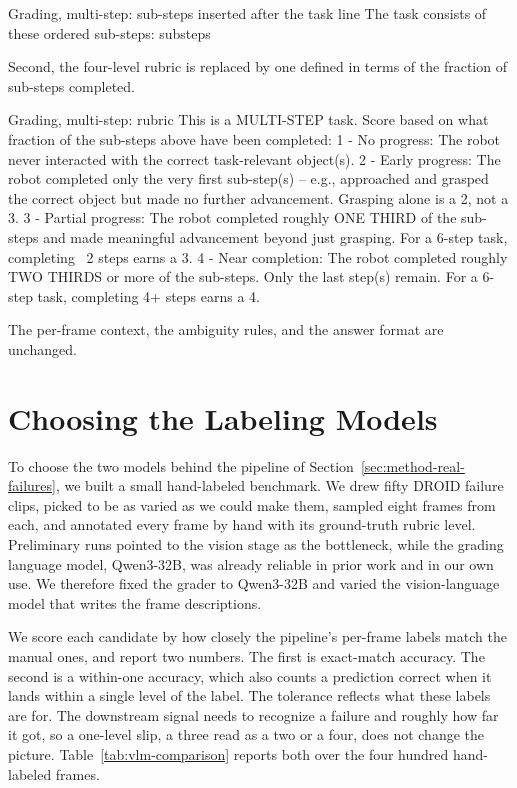 \begin{llmprompt}{Grading, multi-step: sub-steps inserted after the task line}
The task consists of these ordered sub-steps:
{substeps}
\end{llmprompt}

Second, the four-level rubric is replaced by one defined in terms of the fraction of sub-steps completed.

\begin{llmprompt}{Grading, multi-step: rubric}
This is a MULTI-STEP task. Score based on what fraction of the sub-steps above have been completed:
1 - No progress: The robot never interacted with the correct task-relevant object(s).
2 - Early progress: The robot completed only the very first sub-step(s) -- e.g., approached and grasped the correct object but made no further advancement. Grasping alone is a 2, not a 3.
3 - Partial progress: The robot completed roughly ONE THIRD of the sub-steps and made meaningful advancement beyond just grasping. For a 6-step task, completing ~2 steps earns a 3.
4 - Near completion: The robot completed roughly TWO THIRDS or more of the sub-steps. Only the last step(s) remain. For a 6-step task, completing 4+ steps earns a 4.
\end{llmprompt}
The per-frame context, the ambiguity rules, and the answer format are unchanged.

\chapter{Choosing the Labeling Models}
\label{apx:vlm-comparison}

To choose the two models behind the pipeline of Section~\ref{sec:method-real-failures}, we built a small hand-labeled benchmark. We drew fifty DROID failure clips, picked to be as varied as we could make them, sampled eight frames from each, and annotated every frame by hand with its ground-truth rubric level. Preliminary runs pointed to the vision stage as the bottleneck, while the grading language model, Qwen3-32B, was already reliable in prior work and in our own use. We therefore fixed the grader to Qwen3-32B and varied the vision-language model that writes the frame descriptions.

We score each candidate by how closely the pipeline's per-frame labels match the manual ones, and report two numbers. The first is exact-match accuracy. The second is a within-one accuracy, which also counts a prediction correct when it lands within a single level of the label. The tolerance reflects what these labels are for. The downstream signal needs to recognize a failure and roughly how far it got, so a one-level slip, a three read as a two or a four, does not change the picture. Table~\ref{tab:vlm-comparison} reports both over the four hundred hand-labeled frames.

